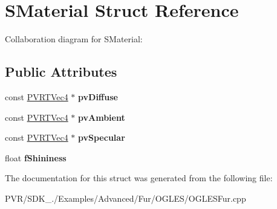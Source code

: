\hypertarget{struct_s_material}{\section{S\+Material Struct Reference}
\label{struct_s_material}
}


Collaboration diagram for S\+Material\+:
\subsection*{Public Attributes}
\begin{DoxyCompactItemize}
\item 
\hypertarget{struct_s_material_a5184d18a370181c464b9451fee5eb52a}{const \hyperlink{struct_p_v_r_t_vec4}{P\+V\+R\+T\+Vec4} $\ast$ {\bfseries pv\+Diffuse}}\label{struct_s_material_a5184d18a370181c464b9451fee5eb52a}

\item 
\hypertarget{struct_s_material_a954f68eb0ff445b4651a715f619d2df3}{const \hyperlink{struct_p_v_r_t_vec4}{P\+V\+R\+T\+Vec4} $\ast$ {\bfseries pv\+Ambient}}\label{struct_s_material_a954f68eb0ff445b4651a715f619d2df3}

\item 
\hypertarget{struct_s_material_a358a834d43a42abf188a9814c8acbc5f}{const \hyperlink{struct_p_v_r_t_vec4}{P\+V\+R\+T\+Vec4} $\ast$ {\bfseries pv\+Specular}}\label{struct_s_material_a358a834d43a42abf188a9814c8acbc5f}

\item 
\hypertarget{struct_s_material_a41c25fded41e3c43ec5ad3b7f5fb757e}{float {\bfseries f\+Shininess}}\label{struct_s_material_a41c25fded41e3c43ec5ad3b7f5fb757e}

\end{DoxyCompactItemize}


The documentation for this struct was generated from the following file\+:\begin{DoxyCompactItemize}
\item 
P\+V\+R/\+S\+D\+K\+\_./\+Examples/\+Advanced/\+Fur/\+O\+G\+L\+E\+S/O\+G\+L\+E\+S\+Fur.\+cpp\end{DoxyCompactItemize}
